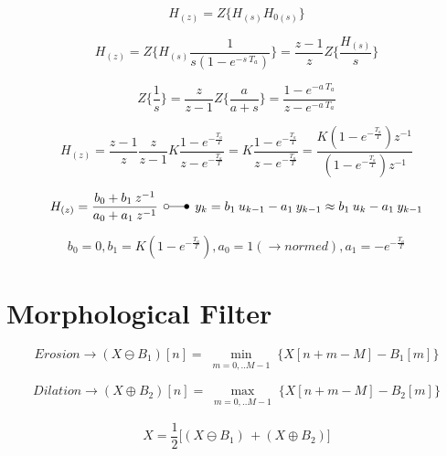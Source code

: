 \documentclass[
    10pt, %
    DIV12,
    english, %
    a5paper, %
    twoside, %
    titlepage, %
    parskip=half, %
    headings=small, %
    listof=totoc, %
    bibliography=totoc, %
    index=totoc, %
    captions=tableheading, %
    final %
]{scrbook}
\begin{document}
\begin{equation}
H_{(z)}=Z\big\{H_{(s)}  H_{0(s)} \big\} \nonumber
\end{equation}

\begin{equation}
H_{(z)}=Z\bigg\{H_{(s)}  \frac{1}{s (1-e^{-s\:T_a})}\bigg\}=\frac{z-1}{z} Z\bigg\{\frac{H_{(s)}}{s}\bigg\} \nonumber
\end{equation}

\begin{equation}
Z\bigg\{\frac{1}{s}\bigg\}=\frac{z}{z-1}
Z\bigg\{\frac{a}{a+s}\bigg\}=\frac{1-e^{-a\:T_a}}{z-e^{-a\: T_a}} \nonumber
\end{equation}

\begin{equation}
H_{(z)}=\frac{z-1}{z} \frac{z}{z-1} K \frac{1-e^{-\frac{T_a}{T}}}{z-e^{-\frac{T_a}{T}}}=K \frac{1-e^{-\frac{T_a}{T}}}{z-e^{-\frac{T_a}{T}}}= \frac{K (1-e^{-\frac{T_a}{T}}) z^{-1}}{(1-e^{-\frac{T_a}{T}}) z^{-1}} \nonumber
\end{equation}

\begin{equation}
H_{(z)}=\frac{b_0+b_1\:z^{-1}}{a_0+a_1\:z^{-1}} \:\: \laplace\:\: y_k=b_1\:u_{k-1}-a_1\:y_{k-1}\approx b_1\:u_{k}-a_1\:y_{k-1} \nonumber
\end{equation}

\begin{equation}
b_0=0, b_1=K(1-e^{-\frac{T_a}{T}}), a_0=1 (\rightarrow normed), a_1=-e^{-\frac{T_a}{T}} \nonumber
\end{equation}

\newpage
\section{Morphological Filter}

\begin{equation}
Erosion \rightarrow (X\ominus B_1)[n] = \min_{\substack{m=0,..M-1}}\Bigg\{X[n+m-M]-B_1[m]\Bigg\} \nonumber
\end{equation}

\begin{equation}
Dilation \rightarrow (X\oplus B_2)[n] = \max_{\substack{m=0,..M-1}}\Bigg\{X[n+m-M]-B_2[m]\Bigg\} \nonumber
\end{equation}

\begin{equation}
X=\frac{1}{2}\big [(X\ominus B_1) \, + (X\oplus B_2) ] \nonumber
\end{equation}
\end{document}

